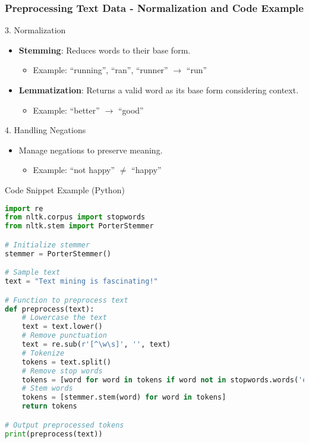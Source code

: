 \documentclass[aspectratio=169]{beamer}
\begin{document}
\begin{frame}[fragile]
    \frametitle{Preprocessing Text Data - Normalization and Code Example}
    \begin{block}{3. Normalization}
        \begin{itemize}
            \item \textbf{Stemming}: Reduces words to their base form.
                \begin{itemize}
                    \item Example: ``running'', ``ran'', ``runner'' $\rightarrow$ ``run''
                \end{itemize}
            \item \textbf{Lemmatization}: Returns a valid word as its base form considering context.
                \begin{itemize}
                    \item Example: ``better'' $\rightarrow$ ``good''
                \end{itemize}
        \end{itemize}
    \end{block}
    
    \begin{block}{4. Handling Negations}
        \begin{itemize}
            \item Manage negations to preserve meaning.
                \begin{itemize}
                    \item Example: ``not happy'' $\neq$ ``happy''
                \end{itemize}
        \end{itemize}
    \end{block}

    \begin{block}{Code Snippet Example (Python)}
        \begin{lstlisting}[language=Python]
import re
from nltk.corpus import stopwords
from nltk.stem import PorterStemmer

# Initialize stemmer
stemmer = PorterStemmer()

# Sample text
text = "Text mining is fascinating!"

# Function to preprocess text
def preprocess(text):
    # Lowercase the text
    text = text.lower()
    # Remove punctuation
    text = re.sub(r'[^\w\s]', '', text)
    # Tokenize
    tokens = text.split()
    # Remove stop words
    tokens = [word for word in tokens if word not in stopwords.words('english')]
    # Stem words
    tokens = [stemmer.stem(word) for word in tokens]
    return tokens

# Output preprocessed tokens
print(preprocess(text))
        \end{lstlisting}
    \end{block}
\end{frame}
\end{document}
